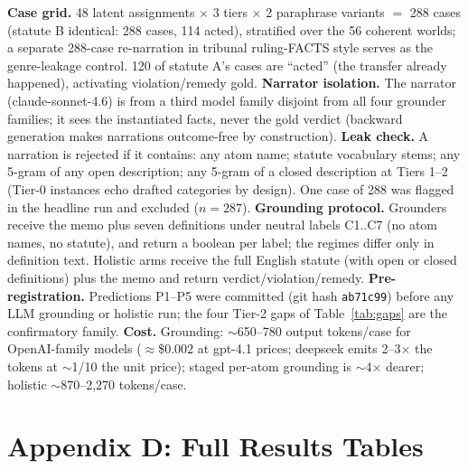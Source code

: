 \textbf{Case grid.} 48 latent assignments $\times$ 3 tiers $\times$ 2
paraphrase variants $=$ 288 cases (statute B identical: 288 cases, 114
acted), stratified over the 56 coherent worlds; a separate 288-case
re-narration in tribunal ruling-FACTS style serves as the genre-leakage
control. 120 of statute A's cases are ``acted'' (the transfer already
happened), activating violation/remedy gold.
\textbf{Narrator isolation.} The narrator (claude-sonnet-4.6) is from a
third model family disjoint from all four grounder families; it sees the
instantiated facts, never the gold verdict (backward generation makes
narrations outcome-free by construction).
\textbf{Leak check.} A narration is rejected if it contains: any atom name;
statute vocabulary stems; any 5-gram of any open description; any 5-gram of
a closed description at Tiers 1--2 (Tier-0 instances echo drafted categories
by design). One case of 288 was flagged in the headline run and excluded
($n=287$).
\textbf{Grounding protocol.} Grounders receive the memo plus seven
definitions under neutral labels C1..C7 (no atom names, no statute), and
return a boolean per label; the regimes differ only in definition text.
Holistic arms receive the full English statute (with open or closed
definitions) plus the memo and return verdict/violation/remedy.
\textbf{Pre-registration.} Predictions P1--P5 were committed (git hash
\texttt{ab71c99}) before any LLM grounding or holistic run; the four Tier-2
gaps of Table~\ref{tab:gaps} are the confirmatory family.
\textbf{Cost.} Grounding: $\sim$650--780 output tokens/case for
OpenAI-family models ($\approx$\$0.002 at gpt-4.1 prices; deepseek emits
2--3$\times$ the tokens at $\sim$1/10 the unit price); staged per-atom
grounding is $\sim$4$\times$ dearer; holistic $\sim$870--2{,}270
tokens/case.

\section{Appendix D: Full Results Tables}

